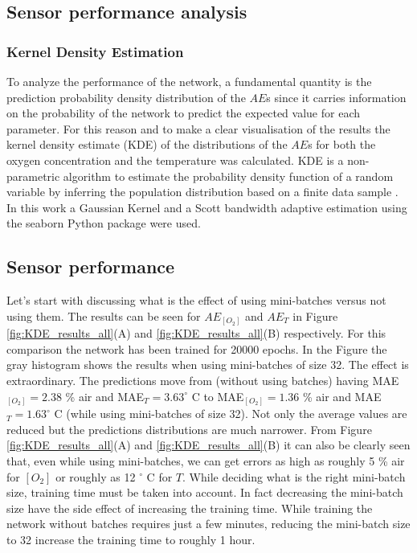 \documentclass[9pt,twocolumn,twoside,pdftex]{optica}
\begin{document}
\subsection{Sensor performance analysis}

\subsubsection{Kernel Density Estimation}

To analyze the performance of the network, a fundamental quantity is the prediction probability density distribution of the $AE$s since it carries information on the probability of the network to predict the expected value for each parameter. For this reason and to make a clear visualisation of the results the  kernel density estimate (KDE) of the distributions of the $AE$s for both the oxygen concentration and the temperature was calculated. KDE is a non-parametric algorithm to estimate the probability density function of a random variable by inferring the population distribution based on a finite data sample \cite{Hastie2009}. 
In this work a Gaussian Kernel and a Scott bandwidth adaptive estimation \cite{Sain1996} using the seaborn Python package \cite{Waskom2020} were used.


\subsection{Sensor performance}

Let's start with discussing what is the effect of using mini-batches versus not using them. The results can be seen for  $AE_{[O_2]}$ and $AE_T$  in Figure \ref{fig:KDE_results_all}(A) and \ref{fig:KDE_results_all}(B) respectively. For this comparison the network has been trained for 20000 epochs. In the Figure the gray histogram shows the results when using mini-batches of size 32. The effect is extraordinary. The predictions move from (without using batches) having MAE$_{[O_2]}=2.38$ \% air and MAE$_{T}=3.63^\circ$ C to  
MAE$_{[O_2]}=1.36$ \% air and MAE$_{T}=1.63^\circ$ C (while using mini-batches of size 32). Not only the average values are reduced but the predictions distributions are much narrower. From Figure \ref{fig:KDE_results_all}(A) and \ref{fig:KDE_results_all}(B) it can also be clearly seen that, even while using mini-batches, we can get errors as high as roughly 5 \% air for $[O_2]$ or roughly as 12 $^\circ$ C for $T$. While deciding what is the right mini-batch size, training time must be taken into account. In fact decreasing the mini-batch size have the side effect of increasing the training time. While training the network without batches requires just a few minutes, reducing the mini-batch size to 32 increase the training time to roughly 1 hour.
\end{document}
